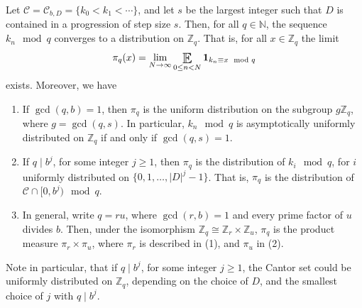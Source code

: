 \begin{lemma} \label{l:Allq}
Let $\mathcal C = \mathcal C_{b,D} 
= \{k_0<k_1 < \cdots\}$, and let $s$ be the largest integer such that $D$ is contained in a progression of step size $s$. 
Then, for all $q\in \mathbb{N}   $, 
the sequence $ k_n\mod q$ converges to a distribution on $\mathbb{Z} _q$. 
That is, for all $x\in \mathbb{Z} _q$ the limit 
\begin{equation}
\pi_q (x) = \lim_{N\to \infty} \Expectation _{0\leq n<N} 
\mathbf{1} _{k_n \equiv x \mod q} 
\end{equation}
exists. Moreover, we have 
\begin{enumerate}
    \item If $\gcd(q,b)=1$, then $\pi_q$ is the uniform distribution on the subgroup $g\mathbb{Z}_q$, where $g=\gcd(q,s)$. 
    In particular, $k_n \mod q $ is asymptotically uniformly distributed on $\mathbb{Z}_q$ if and only if $\gcd(q,s)=1$. 

    \item  If  $q\mid b^j$, for some integer $j\geq 1$,   
    then $\pi_q$ is the distribution of $k_i\mod q$, for $i$ uniformly distributed on $\{0,1,\ldots,\lvert D\rvert^j-1\}$. 
    That is, $\pi_q$ is the distribution of $\mathcal C\cap[0,b^j)\mod q$. 
    
    \item  In general, write $q=ru$, where $\gcd(r,b)=1$  and every prime factor of $u$ divides $b$. 
    Then, under the isomorphism $\mathbb{Z}_q\cong\mathbb{Z}_r\times\mathbb{Z}_u$, $\pi_q$ is the product measure $\pi_r\times\pi_u$, 
    where $\pi_r$ is described in (1), and $\pi_u$ in (2). 
\end{enumerate}
\end{lemma}

Note in particular, that if  $q\mid b^j$, for some integer $j\geq 1$,   the Cantor set could be uniformly distributed on $\mathbb{Z} _{q}$, depending on the choice of $D$, and the smallest choice of $j$ with $q \mid b^j$.  


